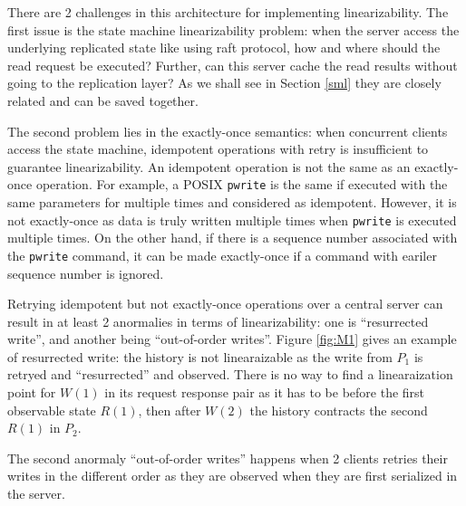 There are 2 challenges in this architecture for implementing linearizability.
The first issue is the state machine linearizability problem: when the server
access the underlying replicated state like using raft protocol, how and
where should the read request be executed? Further, can this server cache the
read results without going to the replication layer? As we shall see in
Section \ref{sml} they are closely related and can be saved together.

The second problem lies in the exactly-once semantics: when concurrent
clients access the state machine, idempotent operations with retry is
insufficient to guarantee linearizability. An idempotent operation is not the
same as an exactly-once operation. For example, a POSIX \texttt{pwrite} is
the same if executed with the same parameters for multiple times and
considered as idempotent. However, it is not exactly-once as data is truly
written multiple times when \texttt{pwrite} is executed multiple times. On
the other hand, if there is a sequence number associated with the
\texttt{pwrite} command, it can be made exactly-once if a command with
eariler sequence number is ignored.

Retrying idempotent but not exactly-once operations over a central server can
result in at least 2 anormalies in terms of linearizability: one is
``resurrected write'', and another being ``out-of-order writes''. Figure
\ref{fig:M1} gives an example of resurrected write: the history is not
linearaizable as the write from $P_1$ is retryed and ``resurrected'' and
observed. There is no way to find a linearaization point for $W(1)$ in its
request response pair as it has to be before the first observable state
$R(1)$, then after $W(2)$ the history contracts the second $R(1)$ in $P_2$.

The second anormaly ``out-of-order writes'' happens when 2 clients retries
their writes in the different order as they are observed when they are first
serialized in the server. 


